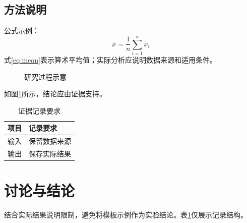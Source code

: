 \documentclass[UTF8,a4paper,fontset=fandol,zihao=5,openany]{ctexrep}
\begin{document}
\section{方法说明}
公式示例：
\begin{equation}\label{eq:mean}
\bar{x}=\frac{1}{n}\sum_{i=1}^{n}x_i
\end{equation}
式\eqref{eq:mean}表示算术平均值；实际分析应说明数据来源和适用条件。
\begin{figure}[htbp]
  \centering
  \caption{研究过程示意}\label{fig:process}
\end{figure}
如图\ref{fig:process}所示，结论应由证据支持。
\begin{table}[htbp]
  \centering
  \begin{tabular}{ll}\toprule
  项目 & 记录要求\\\midrule
  输入 & 保留数据来源\\
  输出 & 保存实际结果\\\bottomrule
  \end{tabular}
  \caption{证据记录要求}\label{tab:evidence}
\end{table}

\chapter{讨论与结论}
结合实际结果说明限制，避免将模板示例作为实验结论。表\ref{tab:evidence}仅展示记录结构。

\clearpage
{}
{}


\end{document}
